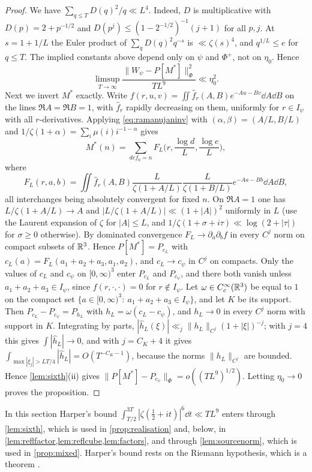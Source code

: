 \documentclass[11pt,colorlinks]{charlie}
\begin{document}
\begin{proof}
We have $\sum_{q\le T}D(q)^2/q\ll L^4$. Indeed, $D$ is multiplicative with $D(p)=2+p^{-1/2}$ and $D(p^j)\le(1-2^{-1/2})^{-1}(j+1)$ for all $p,j$. At $s=1+1/L$ the Euler product of $\sum_qD(q)^2q^{-s}$ is $\ll\zeta(s)^4$, and $q^{1/L}\le e$ for $q\le T$. The implied constants above depend only on $\psi$ and $\Phi^+$, not on $\eta_0$. Hence
\[
 \limsup_{T\to\infty}\frac{\|W_\psi-P[M^*]\|_\Phi^2}{TL^9}\ll\eta_0^2 .
\]
Next we invert $M^*$ exactly. Write $f(r,u,v)=\iint\widehat f_r(A,B)e^{-Au-Bv}\dd A\dd B$ on the lines $\Re A=\Re B=1$, with $\widehat f_r$ rapidly decreasing on them, uniformly for $r\in I_\psi$ with all $r$-derivatives. Applying \eqref{eq:ramanujaninv} with $(\alpha,\beta)=(A/L,B/L)$ and $1/\zeta(1+\alpha)=\sum_i\mu(i)i^{-1-\alpha}$ gives
\[
 M^*(n)=\sum_{def_0=n}F_L\Big(r,\frac{\log d}L,\frac{\log e}L\Big),
\]
where
\[
 F_L(r,a,b)=\iint\widehat f_r(A,B)\frac{L}{\zeta(1+A/L)}\frac{L}{\zeta(1+B/L)}e^{-Aa-Bb}\dd A\dd B,
\]
all interchanges being absolutely convergent for fixed $n$. On $\Re A=1$ one has $L/\zeta(1+A/L)\to A$ and $|L/\zeta(1+A/L)|\ll(1+|A|)^2$ uniformly in $L$ (use the Laurent expansion of $\zeta$ for $|A|\le L$, and $1/\zeta(1+\sigma+i\tau)\ll\log(2+|\tau|)$ for $\sigma\ge0$ otherwise). By dominated convergence $F_L\to\partial_a\partial_bf$ in every $C^j$ norm on compact subsets of $\mathbb{R}^3$. Hence $P[M^*]=P_{c_L}$ with $c_L(a)=F_L(a_1+a_2+a_3,a_1,a_2)$, and $c_L\to c_\psi$ in $C^j$ on compacts. Only the values of $c_L$ and $c_\psi$ on $[0,\infty)^3$ enter $P_{c_L}$ and $P_{c_\psi}$, and there both vanish unless $a_1+a_2+a_3\in I_\psi$, since $f(r,\cdot,\cdot)=0$ for $r\notin I_\psi$. Let $\omega\in C_c^\infty(\mathbb{R}^3)$ be equal to $1$ on the compact set $\{a\in[0,\infty)^3:\ a_1+a_2+a_3\in I_\psi\}$, and let $K$ be its support. Then $P_{c_L}-P_{c_\psi}=P_{h_L}$ with $h_L=\omega(c_L-c_\psi)$, and $h_L\to0$ in every $C^j$ norm with support in $K$. Integrating by parts, $|\widehat h_L(\xi)|\ll_j\|h_L\|_{C^j}(1+|\xi|)^{-j}$; with $j=4$ this gives $\int|\widehat h_L|\to0$, and with $j=C_K+4$ it gives $\int_{\max|\xi_j|>LT/4}|\widehat h_L|=O(T^{-C_K-1})$, because the norms $\|h_L\|_{C^j}$ are bounded. Hence \cref{lem:sixth}(ii) gives $\|P[M^*]-P_{c_\psi}\|_\Phi=o((TL^9)^{1/2})$. Letting $\eta_0\to0$ proves the proposition.
\end{proof}

\begin{remark}
In this section Harper's bound $\int_{T/2}^{3T}|\zeta(\frac12+it)|^6\dd t\ll TL^9$ \cite{Harper} enters through \cref{lem:sixth}, which is used in \cref{prop:realisation} and, below, in \cref{lem:reflfactor,lem:reflcube,lem:factors}, and through \cref{lem:sourcenorm}, which is used in \cref{prop:mixed}. Harper's bound rests on the Riemann hypothesis, which is a theorem \cite{Alpoge}.
\end{remark}
\end{document}
